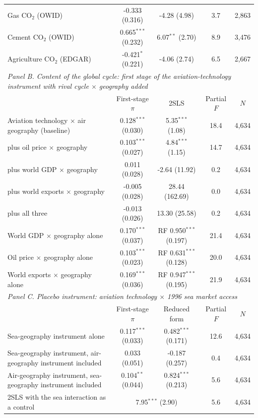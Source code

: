 \documentclass[12pt]{extarticle}
\begin{document}
\begin{table}[H]
{\begin{threeparttable}
\begin{tabular}{lcccc}
  Gas CO$_2$ (OWID) & -0.333 (0.316) & -4.28 (4.98) & 3.7 & 2,863 \\
  Cement CO$_2$ (OWID) & 0.665$^{***}$ (0.232) & 6.07$^{**}$ (2.70) & 8.9 & 3,476 \\
  Agriculture CO$_2$ (EDGAR) & -0.421$^{*}$ (0.221) & -4.06 (2.74) & 6.5 & 2,667 \\
\midrule
\multicolumn{5}{l}{\textit{Panel B. Content of the global cycle: first stage of the aviation-technology instrument with rival cycle $\times$ geography added}} \\
 & First-stage $\pi$ & 2SLS & Partial $F$ & $N$ \\
  Aviation technology $\times$ air geography (baseline) & 0.128$^{***}$ (0.030) & 5.35$^{***}$ (1.08) & 18.4 & 4,634 \\
  \quad plus oil price $\times$ geography & 0.103$^{***}$ (0.027) & 4.84$^{***}$ (1.15) & 14.7 & 4,634 \\
  \quad plus world GDP $\times$ geography & 0.011 (0.028) & -2.64 (11.92) & 0.2 & 4,634 \\
  \quad plus world exports $\times$ geography & -0.005 (0.028) & 28.44 (162.69) & 0.0 & 4,634 \\
  \quad plus all three & -0.013 (0.026) & 13.30 (25.58) & 0.2 & 4,634 \\
  World GDP $\times$ geography alone & 0.170$^{***}$ (0.037) & RF 0.950$^{***}$ (0.197) & 21.4 & 4,634 \\
  Oil price $\times$ geography alone & 0.103$^{***}$ (0.023) & RF 0.631$^{***}$ (0.128) & 20.0 & 4,634 \\
  World exports $\times$ geography alone & 0.169$^{***}$ (0.036) & RF 0.947$^{***}$ (0.195) & 21.9 & 4,634 \\
\midrule
\multicolumn{5}{l}{\textit{Panel C. Placebo instrument: aviation technology $\times$ 1996 sea market access}} \\
 & First-stage $\pi$ & Reduced form & Partial $F$ & $N$ \\
  Sea-geography instrument alone & 0.117$^{***}$ (0.033) & 0.482$^{***}$ (0.171) & 12.6 & 4,634 \\
  Sea-geography instrument, air-geography instrument included & 0.033 (0.051) & -0.187 (0.257) & 0.4 & 4,634 \\
  Air-geography instrument, sea-geography instrument included & 0.104$^{**}$ (0.044) & 0.824$^{***}$ (0.213) & 5.6 & 4,634 \\
  \quad 2SLS with the sea interaction as a control & \multicolumn{2}{c}{7.95$^{***}$ (2.90)} & 5.6 & 4,634 \\

\end{tabular}
\end{threeparttable}}
\end{table}
\end{document}
